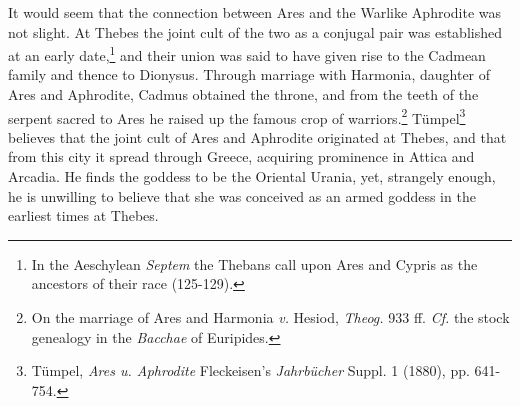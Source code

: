 \documentclass[a4paper, 12pt, oneside]{article}
\begin{document}
It would seem that the connection between Ares and the Warlike Aphrodite was not slight. At Thebes the joint cult of the two as a conjugal pair was established at an early date,\footnote{In the Aeschylean \emph{Septem} the Thebans call upon Ares and Cypris as the ancestors of their race (125-129).} and their union was said to have given rise to the Cadmean family and thence to Dionysus. Through marriage with Harmonia, daughter of Ares and Aphrodite, Cadmus obtained the throne, and from the teeth of the serpent sacred to Ares he raised up the famous crop of warriors.\footnote{On the marriage of Ares and Harmonia \emph{v.} Hesiod, \emph{Theog.} 933 ff. \emph{Cf.} the stock genealogy in the \emph{Bacchae} of Euripides.} Tümpel\footnote{Tümpel, \emph{Ares u. Aphrodite} Fleckeisen's \emph{Jahrbücher} Suppl. 1 (1880), pp. 641-754.} believes that the joint cult of Ares and Aphrodite originated at Thebes, and that from this city it spread through Greece, acquiring prominence in Attica and Arcadia. He finds the goddess to be the Oriental Urania, yet, strangely enough, he is unwilling to believe that she was conceived as an armed goddess in the earliest times at Thebes.
\end{document}
